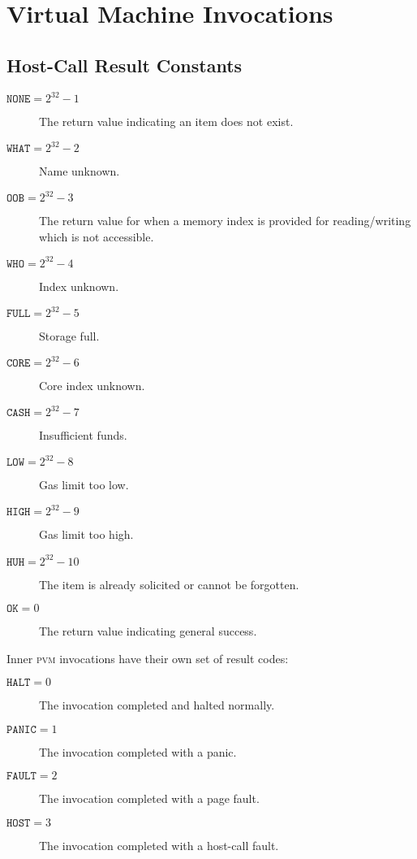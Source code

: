 \section{Virtual Machine Invocations}\label{sec:virtualmachineinvocations}

\newcommand*{\pvm}{\mathbf{M}}
\newcommand*{\segoff}{\varsigma}

\subsection{Host-Call Result Constants}

\begin{description}
  \item[$\mathtt{NONE} = 2^{32} - 1$] The return value indicating an item does not exist.
  \item[$\mathtt{WHAT} = 2^{32} - 2$] Name unknown.
  \item[$\mathtt{OOB} = 2^{32} - 3$] The return value for when a memory index is provided for reading/writing which is not accessible.
  \item[$\mathtt{WHO} = 2^{32} - 4$] Index unknown.
  \item[$\mathtt{FULL} = 2^{32} - 5$] Storage full.
  \item[$\mathtt{CORE} = 2^{32} - 6$] Core index unknown.
  \item[$\mathtt{CASH} = 2^{32} - 7$] Insufficient funds.
  \item[$\mathtt{LOW} = 2^{32} - 8$] Gas limit too low.
  \item[$\mathtt{HIGH} = 2^{32} - 9$] Gas limit too high.
  \item[$\mathtt{HUH} = 2^{32} - 10$] The item is already solicited or cannot be forgotten.
  \item[$\mathtt{OK} = 0$] The return value indicating general success.
\end{description}

Inner \textsc{pvm} invocations have their own set of result codes:
\begin{description}
  \item[$\mathtt{HALT} = 0$] The invocation completed and halted normally.
  \item[$\mathtt{PANIC} = 1$] The invocation completed with a panic.
  \item[$\mathtt{FAULT} = 2$] The invocation completed with a page fault.
  \item[$\mathtt{HOST} = 3$] The invocation completed with a host-call fault.
\end{description}

